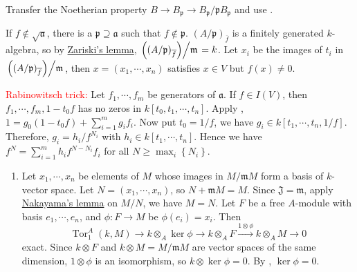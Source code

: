 \begin{exercise}\label{ex7.13}
	Transfer the Noetherian property $B\rightarrow B_\mathfrak{p}\rightarrow B_\mathfrak{p}/\mathfrak{p}B_\mathfrak{p}$ and use .
\end{exercise}

\begin{exercise}[\textcolor{red}{Hilbert's Nullstellensatz}]\label{ex7.14}
	If $f\notin\sqrt{\mathfrak{a}}$, there is a $\mathfrak{p}\supseteq\mathfrak{a}$ such that $f\notin\mathfrak{p}$. $(A/\mathfrak{p})_{\overline{f}}$ is a finitely generated $k$-algebra, so by \hyperref[7.9]{Zariski's lemma}, $\left.\left((A/\mathfrak{p})_{\overline{f}}\right)\middle/\mathfrak{m}\right.=k$. Let $x_i$ be the images of $t_i$ in $\left.\left((A/\mathfrak{p})_{\overline{f}}\right)\middle/\mathfrak{m}\right.$, then $x=\left(x_1,\cdots,x_n\right)$ satisfies $x\in V$ but $f(x)\neq0$.
	
	\textcolor{red}{Rabinowitsch trick:} \textcolor{green!70!black}{Let $f_1,\cdots,f_m$ be generators of $\mathfrak{a}$. If $f\in I(V)$, then $f_1,\cdots,f_m,1-t_0f$ has no zeros in $k\left[t_0,t_1,\cdots,t_n\right]$. Apply , $1=g_0\left(1-t_0f\right)+\sum_{i=1}^mg_if_i$. Now put $t_0=1/f$, we have $g_i\in k\left[t_1,\cdots,t_n,1/f\right]$. Therefore, $g_i=h_i/f^{N_i}$ with $h_i\in k\left[t_1,\cdots,t_n\right]$. Hence we have $f^N=\sum_{i=1}^mh_if^{N-N_i}f_i$ for all $N\geqslant\max_i\left\{N_i\right\}$.}
\end{exercise}

\begin{exercise}\label{ex7.15}
	\begin{enumerate}
		\item[(iv) $\Rightarrow$ (i)] Let $x_1,\cdots,x_n$ be elements of $M$ whose images in $M/\mathfrak{m}M$ form a basis of $k$-vector space. Let $N=\left(x_1,\cdots,x_n\right)$, so $N+\mathfrak{m}M=M$. Since $\mathfrak{J}=\mathfrak{m}$, apply \hyperref[2.6]{Nakayama's lemma} on $M/N$, we have $M=N$. Let $F$ be a free $A$-module with basis $e_1,\cdots,e_n$, and $\phi:F\rightarrow M$ be $\phi\left(e_i\right)=x_i$. Then 
		\begin{equation*}
			\operatorname{Tor}_1^A(k,M)\rightarrow k\otimes_A\ker\phi\rightarrow k\otimes_AF\xrightarrow{1\otimes\phi}k\otimes_AM\rightarrow0
		\end{equation*}
		exact. Since $k\otimes F$ and $k\otimes M=M/\mathfrak{m}M$ are vector spaces of the same dimension, $1\otimes\phi$ is an isomorphism, so $k\otimes\ker\phi=0$. By , $\ker\phi=0$.
	\end{enumerate}
\end{exercise}


